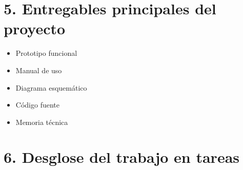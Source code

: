 \documentclass[11pt]{charter}
\begin{document}
\section{5. Entregables principales del proyecto}
\label{sec:entregables}

\begin{itemize}
\item Prototipo funcional
\item Manual de uso
\item Diagrama esquemático
\item Código fuente
\item Memoria técnica
\end{itemize}

\section{6. Desglose del trabajo en tareas}
\label{sec:wbs}
\end{document}
